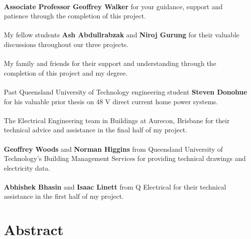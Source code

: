 \paragraph{}
\textbf{Associate Professor Geoffrey Walker} for your guidance, support and patience through the completion of this project. 

\paragraph{}
My fellow students \textbf{Ash Abdullrabzak} and \textbf{Niroj Gurung} for their valuable discussions throughout our three projects. 

\paragraph{}
My family and friends for their support and understanding through the completion of this project and my degree.    

\paragraph{}
Past Queensland University of Technology engineering student \textbf{Steven Donohue} for his valuable prior thesis on 48 V direct current home power systems.  

\paragraph{}
The Electrical Engineering team in Buildings at Aurecon, Brisbane for their technical advice and assistance in the final half of my project.  

\paragraph{}
\textbf{Geoffrey Woods} and \textbf{Norman Higgins} from Queensland University of Technology's Building Management Services for providing technical drawings and electricity data.

\paragraph{}
\textbf{Abhishek Bhasin} and \textbf{Isaac Linett} from Q Electrical for their technical assistance in the first half of my project.



\newpage


\section*{Abstract}

